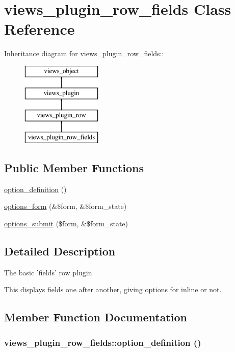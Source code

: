 \hypertarget{classviews__plugin__row__fields}{
\section{views\_\-plugin\_\-row\_\-fields Class Reference}
\label{classviews__plugin__row__fields}
}
Inheritance diagram for views\_\-plugin\_\-row\_\-fields::\begin{figure}[H]
\begin{center}
\leavevmode
\includegraphics[height=4cm]{classviews__plugin__row__fields}
\end{center}
\end{figure}
\subsection*{Public Member Functions}
\begin{CompactItemize}
\item 
\hyperlink{classviews__plugin__row__fields_85538eaa61f4a19de68a693876137934}{option\_\-definition} ()
\item 
\hyperlink{classviews__plugin__row__fields_bb87b6c98697fb676638759cb95072e3}{options\_\-form} (\&\$form, \&\$form\_\-state)
\item 
\hyperlink{classviews__plugin__row__fields_25748927a3375430946259f22c841620}{options\_\-submit} (\$form, \&\$form\_\-state)
\end{CompactItemize}


\subsection{Detailed Description}
The basic 'fields' row plugin

This displays fields one after another, giving options for inline or not. 

\subsection{Member Function Documentation}
\hypertarget{classviews__plugin__row__fields_85538eaa61f4a19de68a693876137934}{
\subsubsection[{option\_\-definition}]{\setlength{\rightskip}{0pt plus 5cm}views\_\-plugin\_\-row\_\-fields::option\_\-definition ()}}
\label{classviews__plugin__row__fields_85538eaa61f4a19de68a693876137934}


